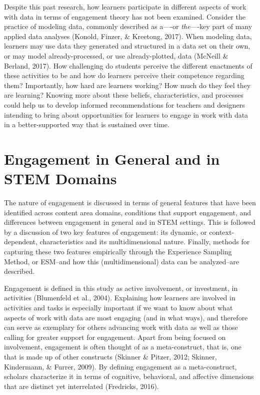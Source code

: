 \documentclass[]{book}
\theoremstyle{definition}
\theoremstyle{definition}
\theoremstyle{definition}
\theoremstyle{remark}
\begin{document}
Despite this past research, how learners participate in different
aspects of work with data in terms of engagement theory has not been
examined. Consider the practice of modeling data, commonly described as
a----or \emph{the}----key part of many applied data analyses (Konold,
Finzer, \& Kreetong, 2017). When modeling data, learners may use data
they generated and structured in a data set on their own, or may model
already-processed, or use already-plotted, data (McNeill \& Berland,
2017). How challenging do students perceive the different enactments of
these activities to be and how do learners perceive their competence
regarding them? Importantly, how hard are learners working? How much do
they feel they are learning? Knowing more about these beliefs,
characteristics, and processes could help us to develop informed
recommendations for teachers and designers intending to bring about
opportunities for learners to engage in work with data in a
better-supported way that is sustained over time.

\section{Engagement in General and in STEM
Domains}\label{engagement-in-general-and-in-stem-domains}

The nature of engagement is discussed in terms of general features that
have been identified across content area domains, conditions that
support engagement, and differences between engagement in general and in
STEM settings. This is followed by a discussion of two key features of
engagement: its dynamic, or context-dependent, characteristics and its
multidimensional nature. Finally, methods for capturing these two
features empirically through the Experience Sampling Method, or ESM--and
how this (multidimensional) data can be analyzed--are described.

Engagement is defined in this study as active involvement, or
investment, in activities (Blumenfeld et al., 2004). Explaining how
learners are involved in activities and tasks is especially important if
we want to know about what aspects of work with data are most engaging
(and in what ways), and therefore can serve as exemplary for others
advancing work with data as well as those calling for greater support
for engagement. Apart from being focused on involvement, engagement is
often thought of as a meta-construct, that is, one that is made up of
other constructs (Skinner \& Pitzer, 2012; Skinner, Kindermann, \&
Furrer, 2009). By defining engagement as a meta-construct, scholars
characterize it in terms of cognitive, behavioral, and affective
dimensions that are distinct yet interrelated (Fredricks, 2016).
\end{document}
